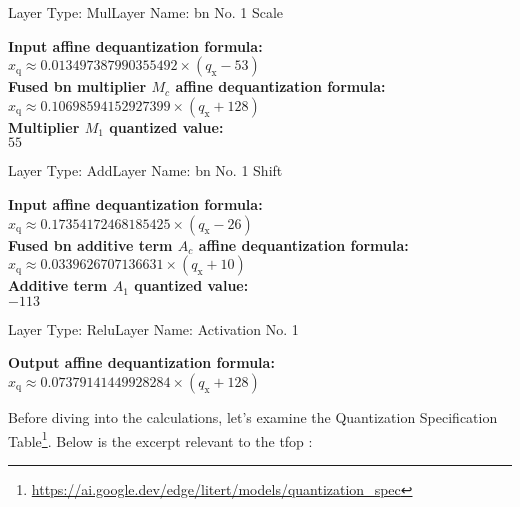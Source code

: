 {\begin{layerbox}{Layer Type: Mul}{Layer Name: \gls{bn} No. 1 Scale}
  \begin{center}
    \textbf{Input affine dequantization formula:} \\[2pt]
    $x_{\text{q}} \approx 0.013497387990355492 \times (q_{\text{x}} - 53)$ \\[6pt]
    \textbf{Fused \gls{bn} multiplier $M_c$ affine dequantization formula:} \\[2pt]
    $x_{\text{q}} \approx 0.10698594152927399 \times (q_{\text{x}} + 128)$ \\[6pt]
    \textbf{Multiplier $M_1$ quantized value:} \\[2pt]
    $55$ \\[6pt]
  \end{center}
\end{layerbox}

\begin{layerbox}{Layer Type: Add}{Layer Name: \gls{bn} No. 1 Shift}
  \begin{center}
    \textbf{Input affine dequantization formula:} \\[2pt]
    $x_{\text{q}} \approx 0.17354172468185425 \times (q_{\text{x}} - 26)$ \\[6pt]
    \textbf{Fused \gls{bn} additive term $A_c$ affine dequantization formula:} \\[2pt]
    $x_{\text{q}} \approx 0.0339626707136631 \times (q_{\text{x}} + 10)$ \\[6pt]
    \textbf{Additive term $A_1$ quantized value:} \\[2pt]
    $-113$ \\[6pt]
  \end{center}
\end{layerbox}

\begin{layerbox}{Layer Type: Relu}{Layer Name: Activation No. 1}
  \begin{center}
    \textbf{Output affine dequantization formula:} \\[2pt]
    $x_{\text{q}} \approx 0.07379141449928284 \times (q_{\text{x}} + 128)$ \\[6pt]
  \end{center}
\end{layerbox}

Before diving into the calculations, let's examine the Quantization Specification Table\footnote{\url{https://ai.google.dev/edge/litert/models/quantization_spec}}. Below is the excerpt relevant to the \gls{tfop} :

}
